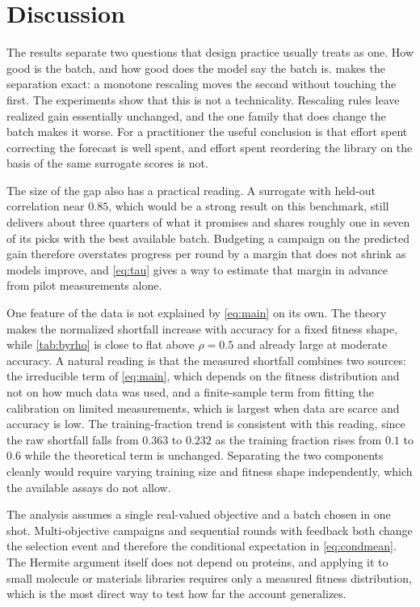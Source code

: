 \documentclass{article}
\theoremstyle{plain}
\theoremstyle{definition}
\begin{document}
\section{Discussion}
\label{sec:discussion}

The results separate two questions that design practice usually treats as one. How good
is the batch, and how good does the model say the batch is.  makes
the separation exact: a monotone rescaling moves the second without touching the first.
The experiments show that this is not a technicality. Rescaling rules leave realized
gain essentially unchanged, and the one family that does change the batch makes it
worse. For a practitioner the useful conclusion is that effort spent correcting the
forecast is well spent, and effort spent reordering the library on the basis of the same
surrogate scores is not.

The size of the gap also has a practical reading. A surrogate with held-out correlation
near $0.85$, which would be a strong result on this benchmark, still delivers about
three quarters of what it promises and shares roughly one in seven of its picks with the
best available batch. Budgeting a campaign on the predicted gain therefore overstates
progress per round by a margin that does not shrink as models improve, and
\cref{eq:tau} gives a way to estimate that margin in advance from pilot measurements
alone.

One feature of the data is not explained by \cref{eq:main} on its own. The theory makes
the normalized shortfall increase with accuracy for a fixed fitness shape, while
\cref{tab:byrho} is close to flat above $\rho = 0.5$ and already large at moderate
accuracy. A natural reading is that the measured shortfall combines two sources: the
irreducible term of \cref{eq:main}, which depends on the fitness distribution and not
on how much data was used, and a finite-sample term from fitting the calibration on
limited measurements, which is largest when data are scarce and accuracy is low. The
training-fraction trend is consistent with this reading, since the raw shortfall falls
from $0.363$ to $0.232$ as the training fraction rises from $0.1$ to $0.6$ while the
theoretical term is unchanged. Separating the two components cleanly would require
varying training size and fitness shape independently, which the available assays do not
allow.

The analysis assumes a single real-valued objective and a batch chosen in one shot.
Multi-objective campaigns and sequential rounds with feedback both change the selection
event and therefore the conditional expectation in \cref{eq:condmean}. The Hermite
argument itself does not depend on proteins, and applying it to small molecule or
materials libraries requires only a measured fitness distribution, which is the most
direct way to test how far the account generalizes.
\end{document}
